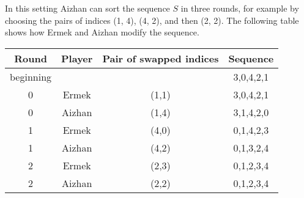 In this setting Aizhan can sort the sequence $S$ in three rounds, for example by choosing the pairs of indices (1, 4), (4, 2), and then (2, 2). The following table shows how Ermek and Aizhan modify the sequence.
\begin{center}
\begin{tabular}{|c|c|c|c|}
\hline
Round & Player & Pair of swapped indices &  Sequence\\
\hline
beginning & & & 3,0,4,2,1 \\
\hline
0 & Ermek & (1,1) & 3,0,4,2,1 \\
\hline
0 & Aizhan & (1,4) & 3,1,4,2,0 \\
\hline
1 & Ermek & (4,0) & 0,1,4,2,3 \\
\hline
1 & Aizhan & (4,2) & 0,1,3,2,4 \\
\hline
2 & Ermek & (2,3) & 0,1,2,3,4 \\
\hline
2 & Aizhan & (2,2) & 0,1,2,3,4\\
\hline
\end{tabular}
\end{center}